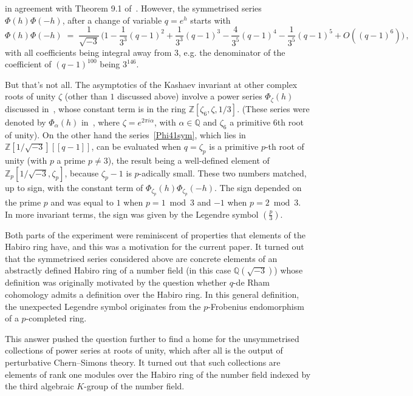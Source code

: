 \documentclass[12pt,reqno]{amsart}
\theoremstyle{definition}
\def\BZ{\mathbb Z}
\def\BQ{\mathbb Q}
\def\a{\alpha}
\def\be{\begin{equation}}
\def\ee{\end{equation}}
\def\z{\zeta}
\def\={\;=\;}
\begin{document}
\noindent
in agreement with Theorem 9.1 of~\cite{GZ:kashaev}. 
However, the symmetrised series $\Phi(h)\Phi(-h)$, after a change of variable $q=e^h$
starts with 
\be
\label{Phi41sym}
\Phi(h)\Phi(-h) \= \frac1{\sqrt{-3}}\,
\big(1 - \frac{1}{3^3} (q-1)^2 + \frac{1}{3^3} (q-1)^3 - \frac{4}{3^5} (q-1)^4
- \frac{1}{3^5} (q-1)^5 + O((q-1)^6) \big)\,,
\ee
with all coefficients being integral away from $3$,
e.g. the denominator of the coefficient of $(q-1)^{100}$ being $3^{146}$.

But that's not all. The asymptotics of the Kashaev invariant at other complex roots
of unity $\z$ (other than $1$ discussed above) involve a power series $\Phi_\z(h)$
discussed in~\cite{GZ:kashaev}, whose constant term is in the ring $\BZ[\z_6,\z,1/3]$.
(These series were denoted by $\Phi_\a(h)$ in~\cite{GZ:kashaev}, where
$\z=e^{2 \pi i \a}$, with $\a \in \BQ$ and $\z_6$ a primitive 6th root of unity).
On the other hand the series~\eqref{Phi41sym}, which lies in
$\BZ[1/\sqrt{-3}][\![q-1]\!]$, can be evaluated when $q=\z_p$ is a primitive $p$-th
root of unity (with $p$ a prime $p \neq 3$), the result being a well-defined element
of $\BZ_p[1/\sqrt{-3},\z_p]$, because $\z_p-1$ is $p$-adically small. These two
numbers matched, up to sign, with the constant term
of $\Phi_{\z_p}(h) \Phi_{\z_p}(-h)$. The sign depended on the prime $p$ and
was equal to $1$ when $p=1 \bmod 3$ and $-1$ when $p=2 \bmod 3$. In more invariant
terms, the sign was given by the Legendre symbol $(\tfrac{p}{3})$. 

Both parts of the experiment were reminiscent of properties that elements of the
Habiro ring have, and this was a motivation for the current paper. It turned out that
the symmetrised series considered above are concrete elements of an abstractly defined
Habiro ring of a number field (in this case $\mathbb{Q}(\sqrt{-3})$) whose definition
was originally motivated by the question
whether $q$-de Rham cohomology admits a definition over the Habiro ring. In this
general definition, the unexpected Legendre symbol originates from the $p$-Frobenius
endomorphism of a $p$-completed ring.

This answer pushed the question further to find a home for the unsymmetrised
collections of power series at roots of unity, which after all is the output of
perturbative Chern--Simons theory. It turned out that such collections are elements
of rank one modules over the Habiro ring of the number field indexed by the third
algebraic $K$-group of the number field.
\end{document}
